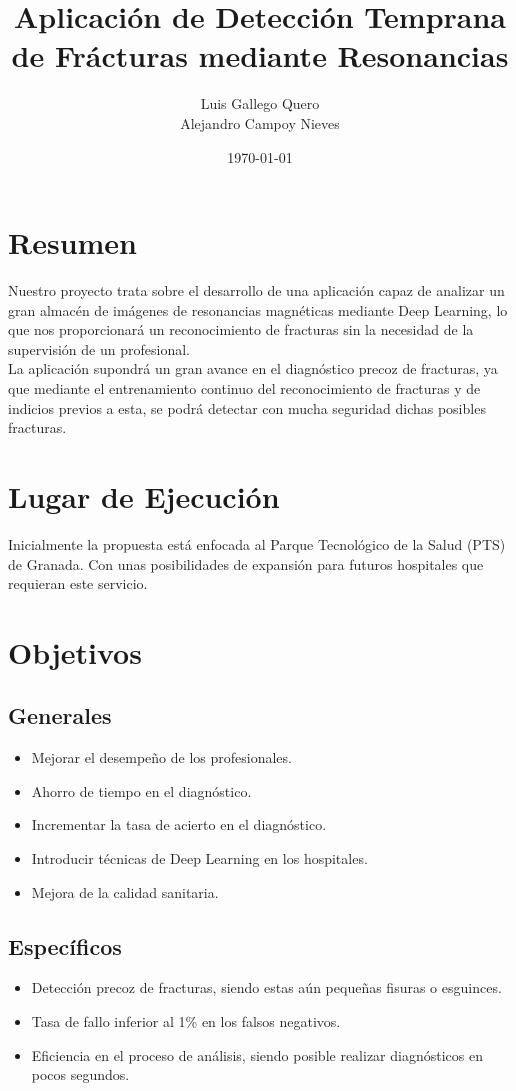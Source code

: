 \documentclass[a4paper,12pt,oneside]{article}
\title{Aplicación de Detección Temprana de Frácturas mediante Resonancias}
\author{Luis Gallego Quero \\ Alejandro Campoy Nieves}
\date{\today}
\begin{document}
\maketitle			
 
\section{Resumen}

Nuestro proyecto trata sobre el desarrollo de una aplicación capaz de analizar un gran almacén de imágenes de resonancias magnéticas mediante Deep Learning, lo que nos proporcionará un reconocimiento de fracturas sin la necesidad de la supervisión de un profesional. \\

La aplicación supondrá un gran avance en el diagnóstico precoz de fracturas, ya que mediante el entrenamiento continuo del reconocimiento de fracturas y de indicios previos a esta, se podrá detectar con mucha seguridad dichas posibles fracturas.

\section{Lugar de Ejecución}

Inicialmente la propuesta está enfocada al Parque Tecnológico de la Salud (PTS) de Granada. Con unas posibilidades de expansión para futuros hospitales que requieran este servicio.

\section{Objetivos}
\subsection{Generales} 
\begin{itemize}
	\item Mejorar el desempeño de los profesionales.
	\item Ahorro de tiempo en el diagnóstico.
	\item Incrementar la tasa de acierto en el diagnóstico.
	\item Introducir técnicas de Deep Learning en los hospitales.
	\item Mejora de la calidad sanitaria.
\end{itemize}

\subsection{Específicos}
\begin{itemize}
	\item Detección precoz de fracturas, siendo estas aún pequeñas fisuras o esguinces.
	\item Tasa de fallo inferior al 1\% en los falsos negativos.
	\item Eficiencia en el proceso de análisis, siendo posible realizar diagnósticos en pocos segundos.
\end{itemize}
\end{document}
